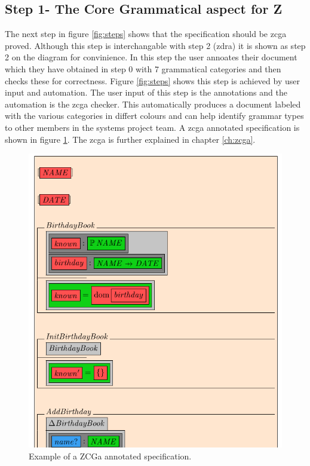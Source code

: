 \subsection{Step 1- The Core Grammatical aspect for Z}

The next step in figure \ref{fig:steps} shows that the specification should be
\gls{zcga} proved. Although this step is interchangable with step 2 (\gls{zdra})
it is shown as step 2 on the diagram for convinience. In this step the user
annoates their document which they have obtained in step 0 with 7 grammatical
categories and then checks these for correctness. Figure \ref{fig:steps} shows
this step is achieved by user input and automation. The user input of this step
is the annotations and the automation is the \gls{zcga} checker. This
automatically produces a document labeled with the various categories in differt
colours and can help identify grammar types to other members in the systems
project team. A \gls{zcga} annotated specification is shown in figure
\ref{fig:zcgaexample}. The \gls{zcga} is further explained in chapter
\ref{ch:zcga}.

\begin{figure}[H]
 \begin{center}
 \includegraphics [scale=0.25]{Figures/Design/zcgaexample.png}
 \caption{Example of a ZCGa annotated specification.}
 \label{fig:zcgaexample}
\end{center}
\end{figure} 

